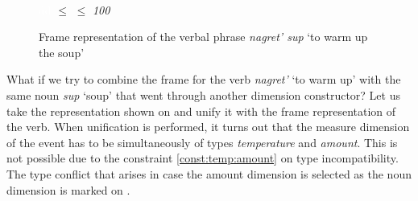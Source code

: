 \begin{figure}
\centering
{}\\
\textcolor{white}{dd}  $\leq$  $\leq$ \textit{100}
\caption{Frame representation of the verbal phrase \textit{nagret' sup} `to warm up the soup' \label{frame:nagret:soup}}
\end{figure}

What if we try to combine the frame for the verb \textit{nagret'} `to warm up' with the same noun \textit{sup} `soup' that went through another dimension constructor? Let us take the representation shown on  and unify it with the frame representation of the verb. When unification is performed, it turns out that the measure dimension of the event has to be simultaneously of types \textit{temperature} and \textit{amount}. This is not possible due to the constraint \ref{const:temp:amount} on type incompatibility. The type conflict that arises in case the amount dimension is selected as the noun dimension is marked on . 

